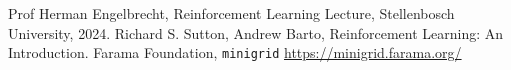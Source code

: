 \begin{thebibliography}{1}
	 Prof Herman Engelbrecht, Reinforcement Learning Lecture, Stellenbosch University, 2024.
	  Richard S. Sutton, Andrew Barto, Reinforcement Learning: An Introduction.
	 Farama Foundation, \texttt{minigrid} \href{https://minigrid.farama.org/}{https://minigrid.farama.org/}
\end{thebibliography}